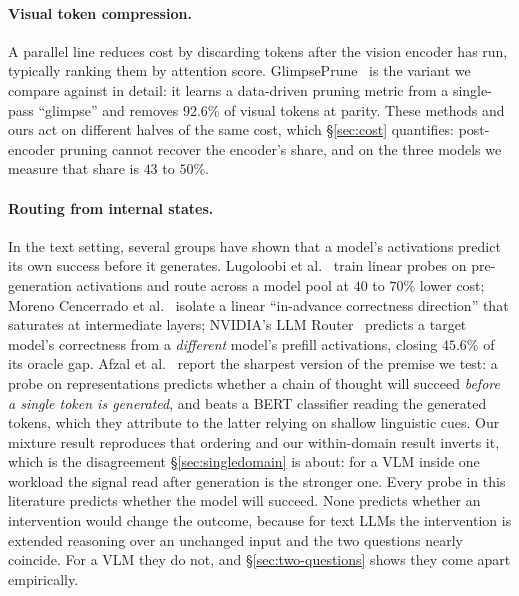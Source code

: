 \documentclass[10pt,twocolumn]{article}
\theoremstyle{plain}
\begin{document}
\paragraph{Visual token compression.} A parallel line reduces cost by discarding
tokens after the vision encoder has run, typically ranking them by attention
score. GlimpsePrune~\cite{glimpseprune} is the variant we compare against in
detail: it learns a data-driven pruning metric from a single-pass ``glimpse''
and removes $92.6\%$ of visual tokens at parity.
These methods and ours act on different halves of the same cost, which
\S\ref{sec:cost} quantifies: post-encoder pruning cannot recover the encoder's
share, and on the three models we measure that share is $43$ to $50\%$.

\paragraph{Routing from internal states.} In the text setting, several groups
have shown that a model's activations predict its own success before it
generates. Lugoloobi et al.~\cite{lugoloobi} train linear probes on
pre-generation activations and route across a model pool at $40$ to $70\%$
lower cost; Moreno Cencerrado et al.~\cite{cencerrado} isolate a linear
``in-advance correctness direction'' that saturates at intermediate layers;
NVIDIA's LLM Router~\cite{llmrouter} predicts a target model's correctness from
a \emph{different} model's prefill activations, closing $45.6\%$ of its oracle
gap. Afzal et al.~\cite{knowingbefore} report the sharpest version of the
premise we test: a probe on representations predicts whether a chain of thought
will succeed \emph{before a single token is generated}, and beats a BERT
classifier reading the generated tokens, which they attribute to the latter
relying on shallow linguistic cues. Our mixture result reproduces that ordering
and our within-domain result inverts it, which is the disagreement
\S\ref{sec:singledomain} is about: for a VLM inside one workload the signal
read after generation is the stronger one. Every probe in this literature
predicts whether the model will succeed.
None predicts whether an intervention would change the outcome, because for
text LLMs the intervention is extended reasoning over an unchanged input and the
two questions nearly coincide. For a VLM they do not, and
\S\ref{sec:two-questions} shows they come apart empirically.
\end{document}
